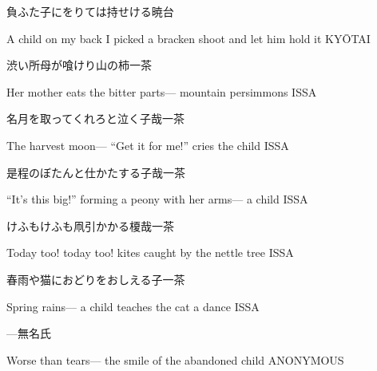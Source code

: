 \begin{haiku}
    {\FH 負ふた子にをりては持せける}\hfill{\FH 暁台}

    \vin{} A child on my back
    \vin{} \vin{} I picked a bracken shoot
    \vin{} \vin{} \vin{} and let him hold it \hspace{\fill} KY\={O}TAI
\end{haiku}

\begin{haiku}
    {\FH 渋い所母が喰けり山の柿}\hfill{\FH 一茶}

    \vin{} Her mother eats
    \vin{} \vin{} the bitter parts---
    \vin{} \vin{} \vin{} mountain persimmons \hspace{\fill} ISSA
\end{haiku}

\begin{haiku}
    {\FH 名月を取ってくれろと泣く子哉}\hfill{\FH 一茶}

    \vin{} The harvest moon---
    \vin{} \vin{} ``Get it for me!''
    \vin{} \vin{} \vin{} cries the child \hspace{\fill} ISSA
\end{haiku}

\begin{haiku}
    {\FH 是程のぼたんと仕かたする子哉}\hfill{\FH 一茶}

    \vin{} ``It's this big!''
    \vin{} \vin{} forming a peony with her arms---
    \vin{} \vin{} \vin{} a child \hspace{\fill} ISSA
\end{haiku}

\begin{haiku}
    {\FH けふもけふも凧引かかる榎哉}\hfill{\FH 一茶}

    \vin{} Today too!
    \vin{} \vin{} today too! kites caught
    \vin{} \vin{} \vin{} by the nettle tree \hspace{\fill} ISSA
\end{haiku}

\begin{haiku}
    {\FH 春雨や猫におどりをおしえる子}\hfill{\FH 一茶}

    \vin{} Spring rains---
    \vin{} \vin{} a child teaches the cat
    \vin{} \vin{} \vin{} a dance \hspace{\fill} ISSA
\end{haiku}

\begin{haiku}
    {---}\hfill{\FH 無名氏}

    \vin{} Worse than tears---
    \vin{} \vin{} the smile of the
    \vin{} \vin{} \vin{} abandoned child \hspace{\fill} ANONYMOUS
\end{haiku}

